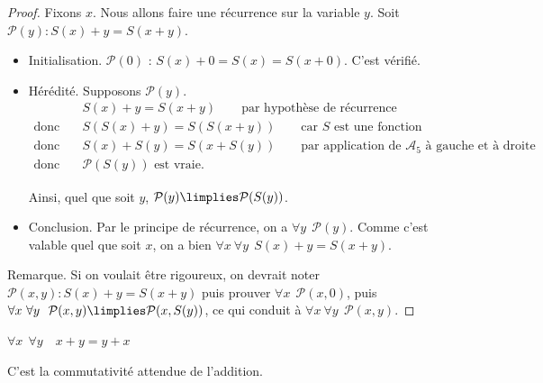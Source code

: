 \documentclass[11pt,class=report,crop=false]{standalone}
\begin{document}
\begin{proof}
Fixons $x$. Nous allons faire une récurrence sur la variable $y$. Soit $\mathcal{P}(y) : S(x)+y=S(x+y)$.
\begin{itemize}
	\item Initialisation. $\mathcal{P}(0)$ : $S(x)+0=S(x)=S(x+0)$. C'est vérifié.
	\item Hérédité. Supposons $\mathcal{P}(y)$.
\begin{align*}
	& S(x)+y = S(x+y) \qquad \text{par hypothèse de récurrence} \\
	\text{donc} \quad & S(S(x)+y) = S(S(x+y)) \qquad \text{car $S$ est une fonction} \\
	\text{donc} \quad & S(x)+S(y) = S(x+S(y)) \qquad \text{par application de $\mathcal{A}_5$ à gauche et à droite} \\
	\text{donc} \quad & \mathcal{P}(S(y)) \text{ est vraie.} 
\end{align*}

Ainsi, quel que soit $y$, $\mathcal{P}(y) \limplies \mathcal{P}(S(y))$.

	\item Conclusion. Par le principe de récurrence, on a $\forall y \ \ \mathcal{P}(y)$.
	Comme c'est valable quel que soit $x$, on a bien $\forall x \ \forall y \ \ S(x)+y = S(x+y)$.
\end{itemize}


Remarque. Si on voulait être rigoureux, on devrait noter $\mathcal{P}(x,y) : S(x)+y = S(x+y)$ puis prouver $\forall x \ \ \mathcal{P}(x,0)$, puis $\forall x \ \forall y \ \ \mathcal{P}(x,y) \limplies \mathcal{P}(x,S(y))$, ce qui conduit à $\forall x \ \forall y \ \ \mathcal{P}(x,y)$.
\end{proof}


\begin{lemme}
	\label{lem:peano3}
	$\forall x \ \ \forall y \quad x+y = y+x$
\end{lemme}

C'est la commutativité attendue de l'addition.
\end{document}
